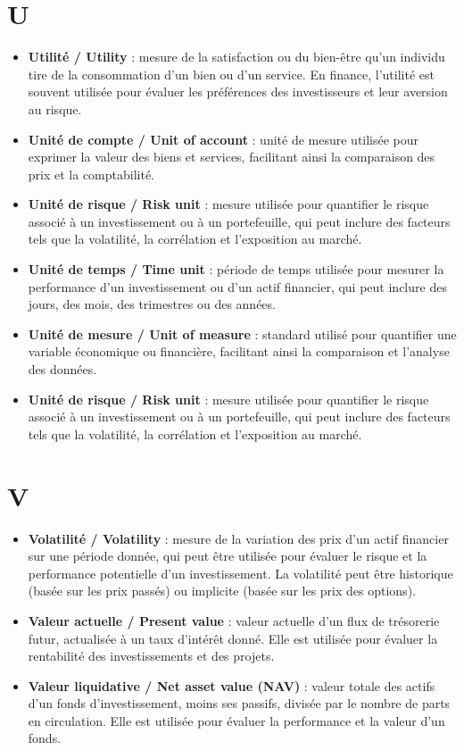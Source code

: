 \documentclass[a4paper,10pt]{article}
\begin{document}
\begin{multicols}{2}
\section*{U}
\begin{itemize}
  \item \textbf{Utilité / Utility} : mesure de la satisfaction ou du bien-être qu’un individu tire de la consommation d’un bien ou d’un service. En finance, l’utilité est souvent utilisée pour évaluer les préférences des investisseurs et leur aversion au risque.
  \item \textbf{Unité de compte / Unit of account} : unité de mesure utilisée pour exprimer la valeur des biens et services, facilitant ainsi la comparaison des prix et la comptabilité.
  \item \textbf{Unité de risque / Risk unit} : mesure utilisée pour quantifier le risque associé à un investissement ou à un portefeuille, qui peut inclure des facteurs tels que la volatilité, la corrélation et l’exposition au marché.
  \item \textbf{Unité de temps / Time unit} : période de temps utilisée pour mesurer la performance d’un investissement ou d’un actif financier, qui peut inclure des jours, des mois, des trimestres ou des années.
  \item \textbf{Unité de mesure / Unit of measure} : standard utilisé pour quantifier une variable économique ou financière, facilitant ainsi la comparaison et l’analyse des données.
  \item \textbf{Unité de risque / Risk unit} : mesure utilisée pour quantifier le risque associé à un investissement ou à un portefeuille, qui peut inclure des facteurs tels que la volatilité, la corrélation et l’exposition au marché.
\end{itemize}

\section*{V}
\begin{itemize}
  \item \textbf{Volatilité / Volatility} : mesure de la variation des prix d’un actif financier sur une période donnée, qui peut être utilisée pour évaluer le risque et la performance potentielle d’un investissement. La volatilité peut être historique (basée sur les prix passés) ou implicite (basée sur les prix des options).
  \item \textbf{Valeur actuelle / Present value} : valeur actuelle d’un flux de trésorerie futur, actualisée à un taux d’intérêt donné. Elle est utilisée pour évaluer la rentabilité des investissements et des projets.
  \item \textbf{Valeur liquidative / Net asset value (NAV)} : valeur totale des actifs d’un fonds d’investissement, moins ses passifs, divisée par le nombre de parts en circulation. Elle est utilisée pour évaluer la performance et la valeur d’un fonds.
\end{itemize}


\end{multicols}
\end{document}
